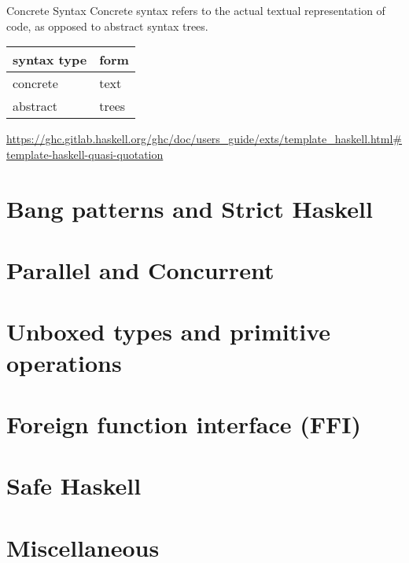 \documentclass[openany, 12pt]{book}
\begin{document}
\begin{definition}{Concrete Syntax}{}
	Concrete syntax refers to the actual textual representation of code, as
	opposed to abstract syntax trees.
	\begin{center}
		\begin{tabular}{ll}
			\toprule
			syntax type & form  \\
			\midrule
			concrete    & text  \\
			abstract    & trees \\
			\bottomrule
		\end{tabular}
	\end{center}
\end{definition}

\url{https://ghc.gitlab.haskell.org/ghc/doc/users_guide/exts/template_haskell.html#template-haskell-quasi-quotation}

\part{Bang patterns and Strict Haskell}
\part{Parallel and Concurrent}
\part{Unboxed types and primitive operations}
\part{Foreign function interface (FFI)}
\part{Safe Haskell}
\part{Miscellaneous}
\end{document}
